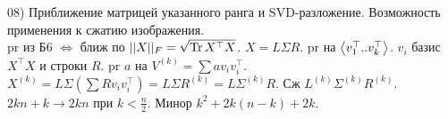 08) Приближение матрицей указанного ранга и SVD-разложение. Возможность применения к сжатию изображения.\\
pr из Б6 $\Leftrightarrow$ ближ по $||X||_F = \sqrt{\operatorname{Tr} X^{\top}X}$. $X = L\Sigma R$. pr на $\left\langle v_1^{\top}..v_k^{\top} \right\rangle$. $v_i$ базис $X^{\top}X$ и строки $R$. pr $a$ на $V^{(k)} = \sum av_iv_i^{\top}$. $X^{(k)} = L\Sigma(\sum Rv_iv_i^{\top}) = L\Sigma R^{(k)} = L\Sigma^{(k)}R$. Сж $L^{(k)}\Sigma^{(k)}R^{(k)}$. $2kn +k \to 2kn$ при $k < \frac{n}{2}$. Минор $k^2 + 2k(n-k) + 2k$.\\
